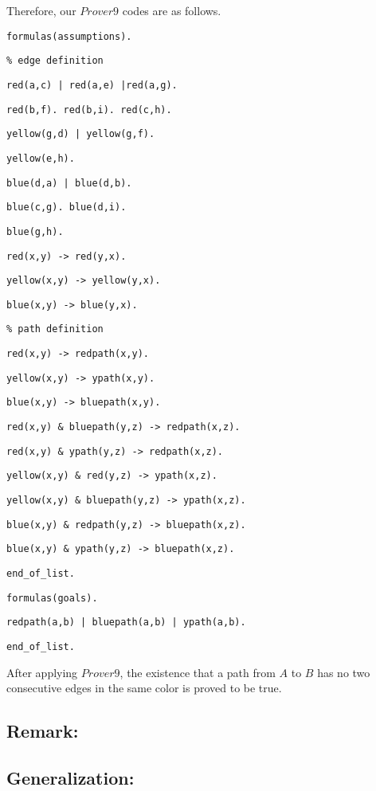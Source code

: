 Therefore, our $Prover9$ codes are as follows.

{\footnotesize

{\tt formulas(assumptions).}

{\tt \% edge definition }

{\tt red(a,c) | red(a,e) |red(a,g).}

{\tt red(b,f). red(b,i). red(c,h).}

{\tt yellow(g,d) | yellow(g,f).}

{\tt yellow(e,h).}

{\tt blue(d,a) | blue(d,b).}

{\tt blue(c,g). blue(d,i).}

{\tt blue(g,h).}

{\tt red(x,y) -> red(y,x).}

{\tt yellow(x,y) -> yellow(y,x).}

{\tt blue(x,y) -> blue(y,x).}

{\tt \% path definition}

{\tt red(x,y) -> redpath(x,y).}

{\tt yellow(x,y) -> ypath(x,y).}

{\tt blue(x,y) -> bluepath(x,y).}

{\tt red(x,y) \& bluepath(y,z) -> redpath(x,z).}

{\tt red(x,y) \& ypath(y,z) -> redpath(x,z).}

{\tt yellow(x,y) \& red(y,z) -> ypath(x,z).}

{\tt yellow(x,y) \& bluepath(y,z) -> ypath(x,z).}

{\tt blue(x,y) \& redpath(y,z) -> bluepath(x,z).}

{\tt blue(x,y) \& ypath(y,z) -> bluepath(x,z).}

{\tt end\_of\_list.}

{\tt formulas(goals).}

{\tt redpath(a,b) | bluepath(a,b) | ypath(a,b).}

{\tt end\_of\_list.}

}

After applying $Prover9$, the existence that a path from $A$ to $B$ has no two consecutive edges in the same color is proved to be true.

\subsection*{Remark:}


\subsection*{Generalization:}




